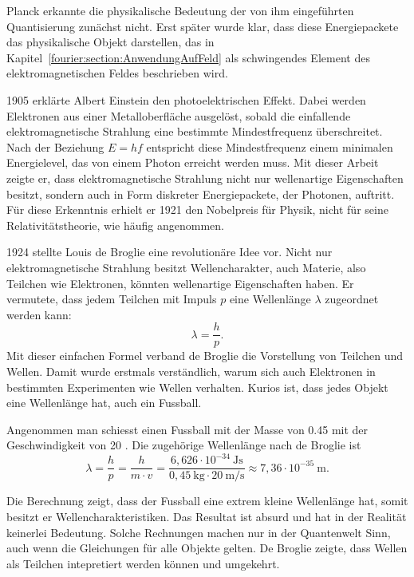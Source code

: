 	
	Planck erkannte die physikalische Bedeutung der von ihm eingeführten Quantisierung zunächst nicht. 
	Erst später wurde klar, dass diese Energiepackete das physikalische Objekt darstellen, das in Kapitel~\ref{fourier:section:AnwendungAufFeld} als schwingendes Element des elektromagnetischen Feldes beschrieben wird.
	
	
	1905 erklärte Albert Einstein den photoelektrischen Effekt. 
	Dabei werden Elektronen aus einer Metalloberfläche ausgelöst, sobald die einfallende elektromagnetische Strahlung eine bestimmte Mindestfrequenz überschreitet. 
	Nach der Beziehung $E = hf$ entspricht diese Mindestfrequenz einem minimalen Energielevel, das von einem Photon erreicht werden muss.
	Mit dieser Arbeit zeigte er, dass elektromagnetische Strahlung nicht nur wellenartige Eigenschaften besitzt, sondern auch in Form diskreter Energiepackete, der Photonen, auftritt. 
	Für diese Erkenntnis erhielt er 1921 den Nobelpreis für Physik, nicht für seine Relativitätstheorie, wie häufig angenommen.
	
	
	
	1924 stellte Louis de Broglie eine revolutionäre Idee vor.
	Nicht nur elektromagnetische Strahlung besitzt Wellencharakter, auch Materie, also Teilchen wie Elektronen, könnten wellenartige Eigenschaften haben.
	Er vermutete, dass jedem Teilchen mit Impuls $p$ eine Wellenlänge $\lambda$ zugeordnet werden kann:
	\begin{equation}
		\lambda = \frac{h}{p}.
	\end{equation}	
	Mit dieser einfachen Formel verband de Broglie die Vorstellung von Teilchen und Wellen. Damit wurde erstmals verständlich, warum sich auch Elektronen in bestimmten Experimenten wie Wellen verhalten.
	Kurios ist, dass jedes Objekt eine Wellenlänge hat, auch ein Fussball.
	
	
	\begin{beispiel}
	Angenommen man schiesst einen Fussball mit der Masse von 0.45  mit der Geschwindigkeit von 20 .
	Die zugehörige Wellenlänge nach de Broglie ist 
	\begin{equation}
		\lambda = \frac{h}{p} = \frac{h}{m \cdot v} = 	\frac{6{,}626 \cdot 10^{-34} \ \text{Js}}{0{,}45 \ \text{kg} \cdot 20 \ \text{m/s}} \approx 7{,}36 \cdot 10^{-35} \ \text{m}.
	\end{equation}	
	
	Die Berechnung zeigt, dass der Fussball eine extrem kleine Wellenlänge hat, somit besitzt er Wellencharakteristiken.
	Das Resultat ist absurd und hat in der Realität keinerlei Bedeutung.
	Solche Rechnungen machen nur in der Quantenwelt Sinn, auch wenn die Gleichungen für alle Objekte gelten. 
	De Broglie zeigte, dass Wellen als Teilchen intepretiert werden können und umgekehrt. 
	\end{beispiel}
	
